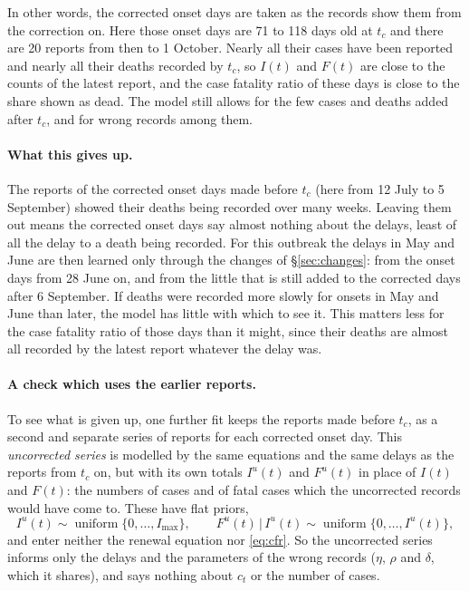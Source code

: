 \documentclass[11pt,a4paper]{article}
\newcommand{\given}{\,|\,}
\begin{document}
In other words, the corrected onset days are taken as the records show them
from the correction on. Here those onset days are 71 to 118 days old at
$t_c$ and there are 20 reports from then to 1 October. Nearly all their
cases have been reported and nearly all their deaths recorded by $t_c$, so
$I(t)$ and $F(t)$ are close to the counts of the latest report, and the
case fatality ratio of these days is close to the share shown as dead. The
model still allows for the few cases and deaths added after $t_c$, and for
wrong records among them.

\paragraph{What this gives up.} The reports of the corrected onset days
made before $t_c$ (here from 12 July to 5 September) showed their deaths
being recorded over many weeks. Leaving them out means the corrected onset
days say almost nothing about the delays, least of all the delay to a death
being recorded. For this outbreak the delays in May and June are then
learned only through the changes of \S\ref{sec:changes}: from the onset
days from 28 June on, and from the little that is still added to the
corrected days after 6 September. If deaths were recorded more slowly for
onsets in May and June than later, the model has little with which to see
it. This matters less for the case fatality ratio of those days than it
might, since their deaths are almost all recorded by the latest report
whatever the delay was.

\paragraph{A check which uses the earlier reports.} To see what is given
up, one further fit keeps the reports made before $t_c$, as a second and
separate series of reports for each corrected onset day. This
\emph{uncorrected series} is modelled by the same equations and the same
delays as the reports from $t_c$ on, but with its own totals $I^{u}(t)$ and
$F^{u}(t)$ in place of $I(t)$ and $F(t)$: the numbers of cases and of fatal
cases which the uncorrected records would have come to. These have flat
priors,
\[
I^{u}(t)\sim\operatorname{uniform}\{0,\dots,I_{\max}\},\qquad
F^{u}(t)\given I^{u}(t)\sim\operatorname{uniform}\{0,\dots,I^{u}(t)\},
\]
and enter neither the renewal equation nor \eqref{eq:cfr}. So the
uncorrected series informs only the delays and the parameters of the wrong
records ($\eta$, $\rho$ and $\delta$, which it shares), and says nothing
about $c_t$ or the number of cases.
\end{document}
